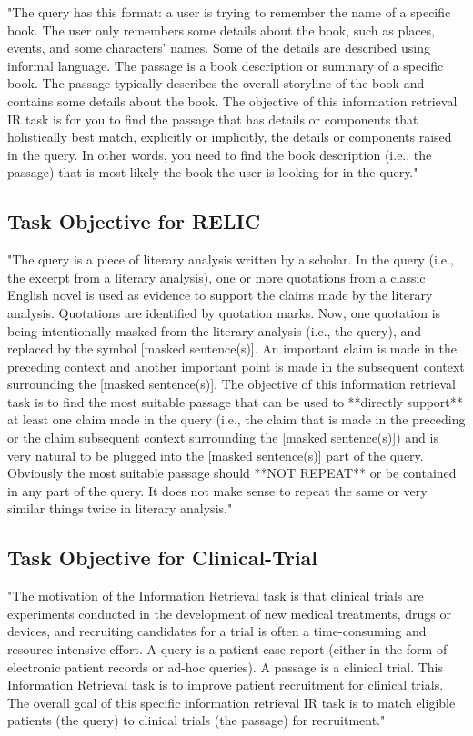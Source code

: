 \documentclass[11pt]{article}
\begin{document}
"The query has this format: a user is trying to remember the name of a specific book. The user only remembers some details about the book, such as places, events, and some characters’ names. Some of the details are described using informal language. The passage is a book description or summary of a specific book. The passage typically describes the overall storyline of the book and contains some details about the book. The objective of this information retrieval IR task is for you to find the passage that has details or components that holistically best match, explicitly or implicitly, the details or components raised in the query. In other words, you need to find the book description (i.e., the passage) that is most likely the book the user is looking for in the query."


\subsection{Task Objective for RELIC}
\label{ssec: appendix_task objective for relic}

"The query is a piece of literary analysis written by a scholar. In the query (i.e., the excerpt from a literary analysis), one or more quotations from a classic English novel is used as evidence to support the claims made by the literary analysis. Quotations are identified by quotation marks. Now, one quotation is being intentionally masked from the literary analysis (i.e., the query), and replaced by the symbol [masked sentence(s)]. An important claim is made in the preceding context and another important point is made in the subsequent context surrounding the [masked sentence(s)]. The objective of this information retrieval task is to find the most suitable passage that can be used to **directly support** at least one claim made in the query (i.e., the claim that is made in the preceding or the claim subsequent context surrounding the [masked sentence(s)]) and is very natural to be plugged into the [masked sentence(s)] part of the query. Obviously the most suitable passage should **NOT REPEAT** or be contained in any part of the query. It does not make sense to repeat the same or very similar things twice in literary analysis."


\subsection{Task Objective for Clinical-Trial}
\label{ssec: appendix_task objective for clinical-trial}
"The motivation of the Information Retrieval task is that clinical trials are experiments conducted in the development of new medical treatments, drugs or devices, and recruiting candidates for a trial is often a time-consuming and resource-intensive effort. A query is a patient case report (either in the form of electronic patient records or ad-hoc queries). A passage is a clinical trial. This Information Retrieval task is to improve patient recruitment for clinical trials. The overall goal of this specific information retrieval IR task is to match eligible patients (the query) to clinical trials (the passage) for recruitment."
\end{document}
